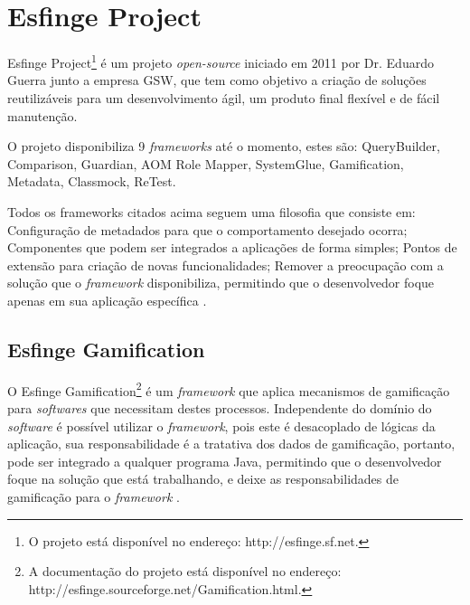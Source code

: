 \section{Esfinge Project}

\par Esfinge Project\footnote{O projeto está disponível no endereço: http://esfinge.sf.net.} é um projeto \textit{open-source} iniciado em 2011 por Dr. Eduardo Guerra junto a empresa GSW, que tem como objetivo a criação de soluções reutilizáveis para um desenvolvimento ágil, um produto final flexível e de fácil manutenção.
\par O projeto disponibiliza 9 \textit{frameworks} até o momento, estes são: QueryBuilder, Comparison, Guardian, AOM Role Mapper, SystemGlue, Gamification, Metadata, Classmock, ReTest.

\par Todos os frameworks citados acima seguem uma filosofia que consiste em: Configuração de metadados para que o comportamento desejado ocorra; Componentes que podem ser integrados a aplicações de forma simples; Pontos de extensão para criação de novas funcionalidades; Remover a preocupação com a solução que o \textit{framework} disponibiliza, permitindo que o desenvolvedor foque apenas em sua aplicação específica \cite{esfingeproject2011}.

\subsection{Esfinge Gamification}

\par O Esfinge Gamification\footnote{A documentação do projeto está disponível no endereço: http://esfinge.sourceforge.net/Gamification.html.} é um \textit{framework} que aplica mecanismos de gamificação para \textit{softwares} que necessitam destes processos. Independente do domínio do \textit{software} é possível utilizar o \textit{framework}, pois este é desacoplado de lógicas da aplicação, sua responsabilidade é a tratativa dos dados de gamificação, portanto, pode ser integrado a qualquer programa Java, permitindo que o desenvolvedor foque na solução que está trabalhando, e deixe as responsabilidades de gamificação para o \textit{framework}  \cite{esfingegamification2011}.


